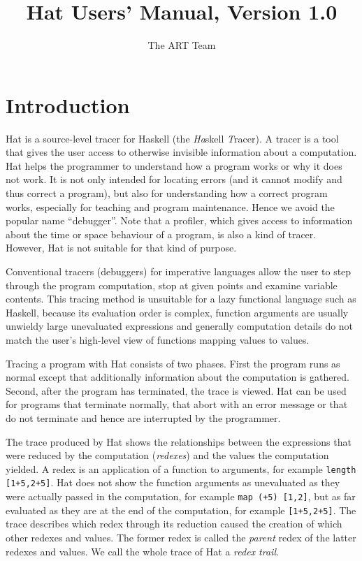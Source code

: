 \documentclass[12pt]{article}
\begin{document}
\title{Hat Users' Manual, Version 1.0}
\author{The ART Team}
\date{}
\maketitle
\vspace{-8ex}

\thispagestyle{empty}

\tableofcontents


\section{Introduction}\label{introduction}

Hat is a source-level tracer for Haskell (the \emph{Ha}skell \emph{T}racer). A tracer is a tool that gives the user access to otherwise invisible information about a computation. Hat helps the programmer to understand how a program works or why it does not work. It is not only intended for locating errors (and it cannot modify and thus correct a program), but also for understanding how a correct program works, especially for teaching and program maintenance. Hence we avoid the popular name ``debugger''. Note that a profiler, which gives access to information about the time or space behaviour of a program, is also a kind of tracer. However, Hat is not suitable for that kind of purpose.

Conventional tracers (debuggers) for imperative languages allow the user to step through the program computation, stop at given points and examine variable contents.
This tracing method is unsuitable for a lazy functional language such as Haskell, because its evaluation order is complex, function arguments are usually unwieldy large unevaluated expressions and generally computation details do not match the user's high-level view of functions mapping values to values.

Tracing a program with Hat consists of two phases. First the program runs as normal except that additionally information about the computation is gathered. Second, after the program has terminated, the trace is viewed. 
Hat can be used for programs that terminate normally, that abort with an error message or that do not terminate and hence are interrupted by the programmer.

The trace produced by Hat shows the relationships between the expressions that were reduced by the computation (\emph{redexes}) and the values the computation yielded. A redex is an application of a function to arguments, for example \texttt{length [1+5,2+5]}. Hat does not show the function arguments as unevaluated as they were actually passed in the computation, for example \texttt{map (+5) [1,2]}, but as far evaluated as they are at the end of the computation, for example \texttt{[1+5,2+5]}. The trace describes which redex through its reduction caused the creation of which other redexes and values. The former redex is called the \emph{parent} redex of the latter redexes and values. We call the whole trace of Hat a \emph{redex trail}.
\end{document}
